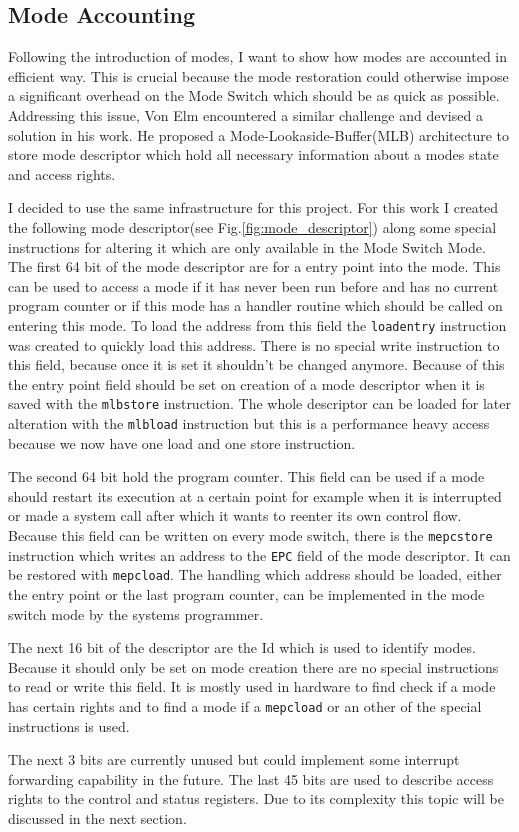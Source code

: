 \subsection{Mode Accounting}
Following the introduction of modes, I want to show how modes are accounted in
efficient way. This is crucial because the mode restoration could otherwise impose a
significant overhead on the Mode Switch which should be as quick as possible.
Addressing this issue, Von Elm\cite{Cve} encountered a similar challenge and
devised a solution in his work. He proposed a Mode-Lookaside-Buffer(MLB)
architecture to store mode descriptor which hold all necessary information
about a modes state and access rights.\par
I decided to use the same infrastructure for this project. For this work I
created the following mode descriptor(see Fig.\ref{fig:mode_descriptor}) along
some special instructions for altering it which are only available in the Mode
Switch Mode. The first 64 bit of the mode
descriptor are for a entry point into the mode. This can be used to access a
mode if it has never been run before and has no current program counter or if
this mode has a handler routine which should be called on entering this mode. To
load the address from this field the \texttt{loadentry} instruction was created
to quickly load this address. There is no special write instruction to this
field, because once it is set it shouldn't be changed anymore. Because of this
the entry point field should be set on creation of a mode descriptor when it is
saved with the \texttt{mlbstore} instruction. The whole descriptor can be loaded
for later alteration with the \texttt{mlbload} instruction but this is a
performance heavy access because we now have one load and one store instruction.\par
The second 64 bit hold the program counter. This field can be used if a mode
should restart its execution at a certain point for example when it is
interrupted or made a system call after which it wants to reenter its own
control flow. Because this field can be written on every mode switch, there is
the \texttt{mepcstore} instruction which writes an address to the \texttt{EPC}
field of the mode descriptor. It can be restored with \texttt{mepcload}. The
handling which address should be loaded, either the entry point or the last
program counter, can be implemented in the mode switch mode by the systems
programmer.\par
The next 16 bit of the descriptor are the Id which is used to identify modes.
Because it should only be set on mode creation there are no special instructions
to read or write this field. It is mostly used in hardware to find check if a
mode has certain rights and to find a mode if a \texttt{mepcload} or an other of
the special instructions is used.\par
The next 3 bits are currently unused but could implement some interrupt
forwarding capability in the future. The last 45 bits are used to describe
access rights to the control and status registers. Due to its complexity this
topic will be discussed in the next section.

